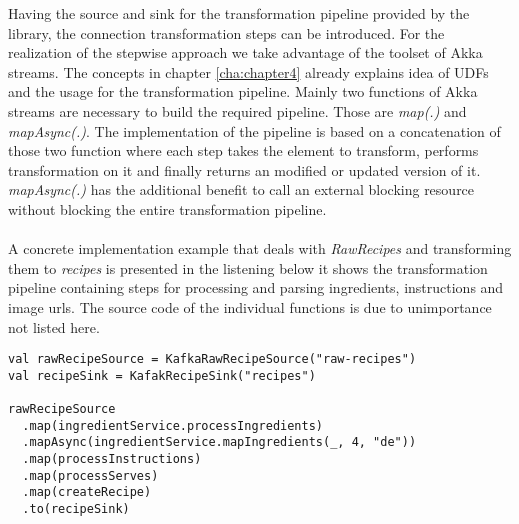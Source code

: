 Having the source and sink for the transformation pipeline provided by the library, the connection transformation steps can be introduced. For the realization of the stepwise approach we take advantage of the toolset of Akka streams. The concepts in chapter \ref{cha:chapter4} already explains idea of UDFs and the usage for the transformation pipeline. Mainly two functions of Akka streams are necessary to build the required pipeline. Those are \textit{map(.)} and \textit{mapAsync(.)}. The implementation of the pipeline is based on a concatenation of those two function where each step takes the element to transform, performs transformation on it and finally returns an modified or updated version of it. \textit{mapAsync(.)} has the additional benefit to call an external blocking resource without blocking the entire transformation pipeline. 
\\\\
A concrete implementation example that deals with \textit{RawRecipes} and transforming them to \textit{recipes} is presented in the listening below it shows the transformation pipeline containing steps for processing and parsing ingredients, instructions and image urls. The source code of the individual functions is due to unimportance not listed here.

\begin{lstlisting}[style=myScalastyle,label={lst:pipeline}]
val rawRecipeSource = KafkaRawRecipeSource("raw-recipes")
val recipeSink = KafakRecipeSink("recipes")

rawRecipeSource
  .map(ingredientService.processIngredients)
  .mapAsync(ingredientService.mapIngredients(_, 4, "de"))
  .map(processInstructions)
  .map(processServes)
  .map(createRecipe)
  .to(recipeSink)
\end{lstlisting}

